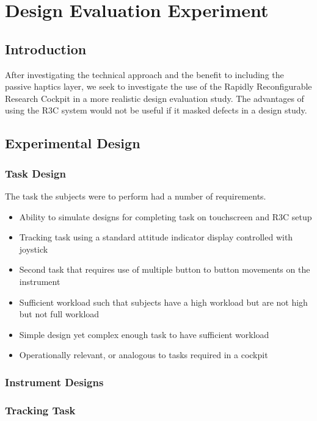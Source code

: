 \chapter{Design Evaluation Experiment}

\section{Introduction}

After investigating the technical approach and the benefit to including the passive haptics layer, we seek to investigate the use of the Rapidly Reconfigurable Research Cockpit in a more realistic design evaluation study.
The advantages of using the R3C system would not be useful if it masked defects in a design study.

\section{Experimental Design}

\subsection{Task Design}

The task the subjects were to perform had a number of requirements.
\begin{itemize}
    \item Ability to simulate designs for completing task on touchscreen and R3C setup
    \item Tracking task using a standard attitude indicator display controlled with joystick
    \item Second task that requires use of multiple button to button movements on the instrument
    \item Sufficient workload such that subjects have a high workload but are not high but not full workload
    \item Simple design yet complex enough task to have sufficient workload
    \item Operationally relevant, or analogous to tasks required in a cockpit
\end{itemize}


\subsection{Instrument Designs}


\subsection{Tracking Task}

